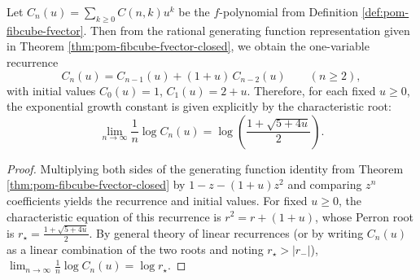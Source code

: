 \begin{corollary}\label{cor:pom-fibcube-fpoly-growth-constant}
Let \(C_n(u)=\sum_{k\ge 0}C(n,k)u^k\) be the \(f\)-polynomial from Definition \ref{def:pom-fibcube-fvector}.
Then from the rational generating function representation given in Theorem \ref{thm:pom-fibcube-fvector-closed}, we obtain the one-variable recurrence
\[
C_n(u)=C_{n-1}(u)+(1+u)\,C_{n-2}(u)\qquad(n\ge 2),
\]
with initial values \(C_0(u)=1\), \(C_1(u)=2+u\).
Therefore, for each fixed \(u\ge 0\), the exponential growth constant is given explicitly by the characteristic root:
\[
\lim_{n\to\infty}\frac{1}{n}\log C_n(u)
=\log\!\left(\frac{1+\sqrt{5+4u}}{2}\right).
\]
\end{corollary}
\begin{proof}
Multiplying both sides of the generating function identity from Theorem \ref{thm:pom-fibcube-fvector-closed} by \(1-z-(1+u)z^2\) and comparing \(z^n\) coefficients yields the recurrence and initial values.
For fixed \(u\ge 0\), the characteristic equation of this recurrence is
\(
r^2=r+(1+u)
\), whose Perron root is
\(
r_\star=\frac{1+\sqrt{5+4u}}{2}
\).
By general theory of linear recurrences (or by writing \(C_n(u)\) as a linear combination of the two roots and noting \(r_\star>|r_-|\)),
\(
\lim_{n\to\infty}\frac{1}{n}\log C_n(u)=\log r_\star
\).
\end{proof}

